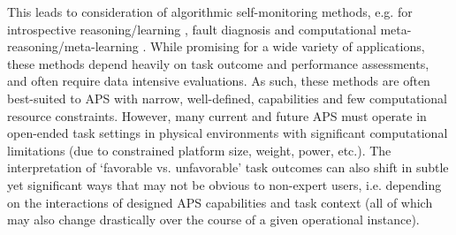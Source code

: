 This leads to consideration of algorithmic self-monitoring methods, e.g. for introspective reasoning/learning \cite{Huang2017-lk}, fault diagnosis and computational meta-reasoning/meta-learning \cite{grant2018recasting}. 
While promising for a wide variety of applications, these methods depend heavily on task outcome and performance assessments, and often require data intensive evaluations. 
As such, these methods are often best-suited to APS with narrow, well-defined, capabilities and few computational resource constraints. 
However, many current and future APS must operate in open-ended task settings in physical environments with significant computational limitations (due to constrained platform size, weight, power, etc.). 
The interpretation of `favorable vs. unfavorable' task outcomes can also shift in subtle yet significant ways that may not be obvious to non-expert users, i.e. depending on the interactions of designed APS capabilities and task context (all of which may also change drastically over the course of a given operational instance). 




